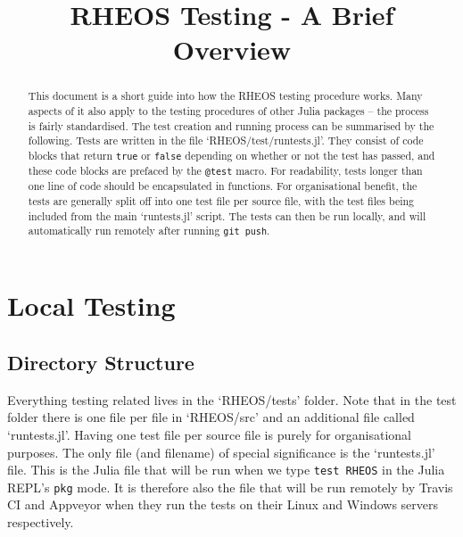 \documentclass[]{article}
\title{RHEOS Testing - A Brief Overview}
\author{}
\newcommand{\cod}[1]{\colorbox{light-light-gray}{\texttt{#1}}}
\begin{document}
	
\date{}
\maketitle

\begin{abstract}
This document is a short guide into how the RHEOS testing procedure works. Many aspects of it also apply to the testing procedures of other Julia packages -- the process is fairly standardised. The test creation and running process can be summarised by the following. Tests are written in the file `RHEOS/test/runtests.jl'. They consist of code blocks that return \cod{true} or \cod{false} depending on whether or not the test has passed, and these code blocks are prefaced by the \cod{@test} macro. For readability, tests longer than one line of code should be encapsulated in functions. For organisational benefit, the tests are generally split off into one test file per source file, with the test files being included from the main `runtests.jl' script. The tests can then be run locally, and will automatically run remotely after running \cod{git push}.

\end{abstract}

\section{Local Testing}
\subsection{Directory Structure}
Everything testing related lives in the `RHEOS/tests' folder. Note that in the test folder there is one file per file in `RHEOS/src' and an additional file called `runtests.jl'. Having one test file per source file is purely for organisational purposes. The only file (and filename) of special significance is the `runtests.jl' file. This is the Julia file that will be run when we type \cod{test RHEOS} in the Julia REPL's \cod{pkg} mode. It is therefore also the file that will be run remotely by Travis CI and Appveyor when they run the tests on their Linux and Windows servers respectively.
\end{document}
